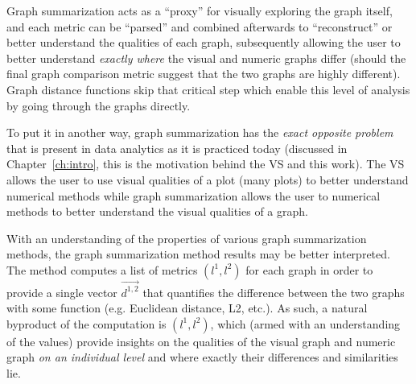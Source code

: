 Graph summarization acts as a ``proxy'' for visually exploring the graph 
itself, and each metric can be ``parsed'' and combined afterwards to 
``reconstruct'' or better understand the qualities of each graph, subsequently 
allowing the user to better understand \textit{exactly where} the visual and 
numeric graphs differ (should the final graph comparison metric suggest that 
the two graphs are highly different). Graph distance functions skip that 
critical step which enable this level of analysis by going through the graphs 
directly.

To put it in another way, graph summarization has the \textit{exact opposite 
problem} that is present in data analytics as it is practiced today (discussed 
in Chapter~\ref{ch:intro}, this is the motivation behind the VS and this work). 
The VS allows the user to use visual qualities of a plot (many plots) to better 
understand numerical methods while graph summarization allows the user to 
numerical methods to better understand the visual qualities of a graph. 

With an understanding of the properties of various graph summarization methods, 
the graph summarization method results may be better interpreted. The method 
computes a list of metrics $(l^1,l^2)$ for each graph in order to provide a 
single vector $\overrightarrow{d^{1,2}}$ that quantifies the difference 
between the two graphs with some function (e.g. Euclidean distance, L2, etc.). 
As such, a natural byproduct of the computation is $(l^1,l^2)$, which (armed 
with an understanding of the values) provide insights on the qualities of the 
visual graph and numeric graph \textit{on an individual level} and where 
exactly their differences and similarities lie.